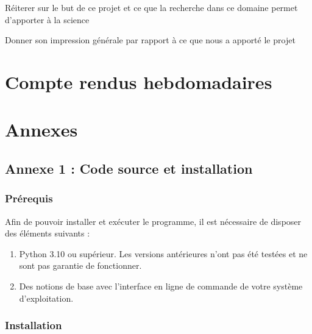 \documentclass[12pt]{scrreprt} %
\begin{document}
Réiterer sur le but de ce projet et ce que la recherche dans ce domaine permet d'apporter à la science

Donner son impression générale par rapport à ce que nous a apporté le projet

\newpage %
\renewcommand{\bibname}{Bibliographie} %


\chapter*{Compte rendus hebdomadaires}

\chapter*{Annexes}

\section*{Annexe 1 : Code source et installation}

\subsection*{Prérequis}

Afin de pouvoir installer et exécuter le programme, il est nécessaire de disposer des éléments suivants :
\begin{enumerate}
    \item Python 3.10 ou supérieur. Les versions antérieures n'ont pas été testées et ne sont pas garantie de fonctionner.
    \item Des notions de base avec l'interface en ligne de commande de votre système d'exploitation.
\end{enumerate}

\subsection*{Installation}
\end{document}
